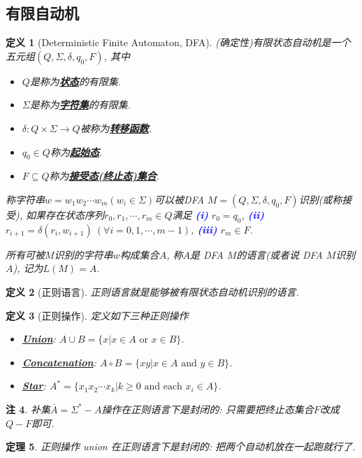 \documentclass[8pt]{article}
\theoremstyle{compact}
\newtheorem{theorem}{定理}[section]
\newtheorem{definition}[theorem]{定义}
\newtheorem{remark}[theorem]{注}
\def\obj#1{\textbf{\uline{#1}}}
\def\num#1{\textnormal{\textbf{\mbox{\textcolor{blue}{(#1)}}}}}
\def\ge{\geqslant}
\begin{document}
\subsection{有限自动机}
\begin{definition}[Deterministic Finite Automaton, DFA]
	(确定性)有限状态自动机是一个五元组$(Q, \Sigma, \delta, q_0, F)$, 其中
	\begin{itemize}
		\item $Q$是称为\obj{状态}的有限集. 
		\item $\Sigma$是称为\obj{字符集}的有限集. 
		\item $\delta: Q \times \Sigma \to Q$被称为\obj{转移函数}. 
		\item $q_0 \in Q$称为\obj{起始态}. 
		\item $F \subseteq Q$称为\obj{接受态(终止态)集合}. 
	\end{itemize}

	称字符串$w = w_1w_2\cdots w_m(w_i \in \Sigma)$可以被DFA $M = (Q, \Sigma, \delta, q_0, F)$识别(或称接受), 如果存在状态序列$r_0, r_1, \cdots, r_m \in Q$满足 \num{i} $r_0 = q_0$, \num{ii} $r_{i+1} = \delta(r_i, w_{i+1}) \ (\forall i = 0, 1, \cdots, m-1)$, \num{iii} $r_m \in F$. 

	所有可被$M$识别的字符串$w$构成集合$A$, 称$A$是 DFA $M$的语言(或者说 DFA $M$识别$A$), 记为$L(M) = A$.
\end{definition}
\begin{definition}[正则语言]
	正则语言就是能够被有限状态自动机识别的语言. 
\end{definition}
\begin{definition}[正则操作]
	定义如下三种正则操作
	\begin{itemize}
		\item \obj{Union}: $A \cup B = \{x | x \in A \textrm{ or } x \in B\}$.
		\item \obj{Concatenation}: $A \circ B = \{xy | x \in A \textrm{ and } y \in B\}$.
		\item \obj{Star}: $A^* = \{x_1x_2\cdots x_k | k \ge 0 \textrm{ and each } x_i \in A\}$.
	\end{itemize}
\end{definition}
\begin{remark}
	补集$\overline{A} = \Sigma^* - A$操作在正则语言下是封闭的: 只需要把终止态集合$F$改成$Q - F$即可.
\end{remark}
\begin{theorem}
	正则操作 union 在正则语言下是封闭的: 把两个自动机放在一起跑就行了. 
\end{theorem}
\end{document}

